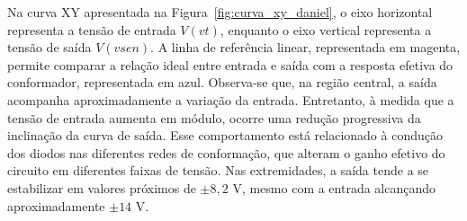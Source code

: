 \documentclass[11pt,a4paper]{article}
\begin{document}
Na curva XY apresentada na Figura~\ref{fig:curva_xy_daniel}, o eixo horizontal representa a tensão de entrada $V(vt)$, enquanto o eixo vertical representa a tensão de saída $V(vsen)$. A linha de referência linear, representada em magenta, permite comparar a relação ideal entre entrada e saída com a resposta efetiva do conformador, representada em azul. Observa-se que, na região central, a saída acompanha aproximadamente a variação da entrada. Entretanto, à medida que a tensão de entrada aumenta em módulo, ocorre uma redução progressiva da inclinação da curva de saída. Esse comportamento está relacionado à condução dos diodos nas diferentes redes de conformação, que alteram o ganho efetivo do circuito em diferentes faixas de tensão. Nas extremidades, a saída tende a se estabilizar em valores próximos de $\pm8{,}2\text{ V}$, mesmo com a entrada alcançando aproximadamente $\pm14\text{ V}$.
\end{document}
